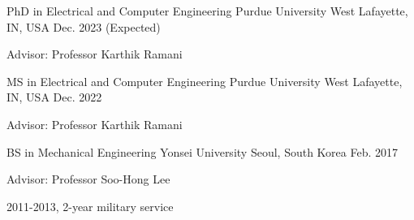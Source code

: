 


\begin{cventries}


    \cventry
    {PhD in Electrical and Computer Engineering} %
    {Purdue University} %
    {West Lafayette, IN, USA} %
    {Dec. 2023 (Expected)} %
    { %
    \begin{cvitems}
        \item {Advisor: Professor Karthik Ramani}
    \end{cvitems}
    }

    \cventry
    {MS in Electrical and Computer Engineering} %
    {Purdue University} %
    {West Lafayette, IN, USA} %
    {Dec. 2022} %
    { %
    \begin{cvitems}
        \item {Advisor: Professor Karthik Ramani}
    \end{cvitems}
    }

    \cventry
    {BS in Mechanical Engineering} %
    {Yonsei University} %
    {Seoul, South Korea} %
    {Feb. 2017} %
    { %
    \begin{cvitems}
        \item {Advisor: Professor Soo-Hong Lee}
        \item {2011-2013, 2-year military service}
    \end{cvitems}
    }

\end{cventries}
